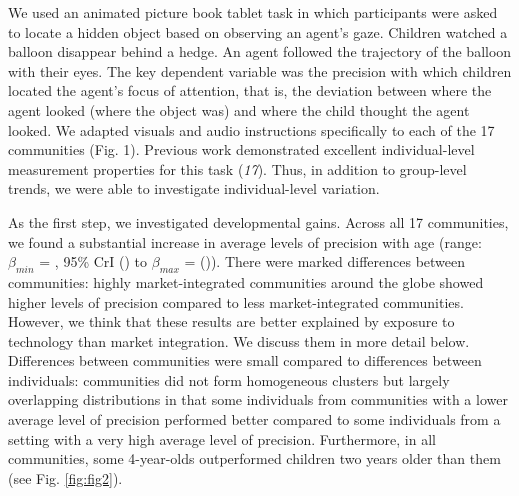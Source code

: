 \documentclass[
  man,floatsintext]{apa6}
\begin{document}
We used an animated picture book tablet task in which participants were asked to locate a hidden object based on observing an agent's gaze. Children watched a balloon disappear behind a hedge. An agent followed the trajectory of the balloon with their eyes. The key dependent variable was the precision with which children located the agent's focus of attention, that is, the deviation between where the agent looked (where the object was) and where the child thought the agent looked. We adapted visuals and audio instructions specifically to each of the 17 communities (Fig. 1). Previous work demonstrated excellent individual-level measurement properties for this task (\emph{17}). Thus, in addition to group-level trends, we were able to investigate individual-level variation.

As the first step, we investigated developmental gains. Across all 17 communities, we found a substantial increase in average levels of precision with age (range: \(\beta_{min}\) = , 95\% CrI () to \(\beta_{max}\) = ()). There were marked differences between communities: highly market-integrated communities around the globe showed higher levels of precision compared to less market-integrated communities. However, we think that these results are better explained by exposure to technology than market integration. We discuss them in more detail below. Differences between communities were small compared to differences between individuals: communities did not form homogeneous clusters but largely overlapping distributions in that some individuals from communities with a lower average level of precision performed better compared to some individuals from a setting with a very high average level of precision. Furthermore, in all communities, some 4-year-olds outperformed children two years older than them (see Fig. \ref{fig:fig2}).
\end{document}

